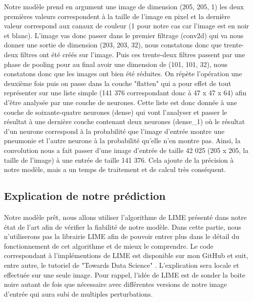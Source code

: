 Notre modèle prend en argument une image de dimension (205, 205, 1) les deux premières valeurs correspondent à la taille de l'image en pixel et la dernière valeur correspond aux canaux de couleur (1 pour notre cas car l'image est en noir et blanc). L'image vas donc passer dans le premier filtrage (conv2d) qui va nous donner une sortie de dimension (203, 203, 32), nous constatons donc que trente-deux filtres ont été créés sur l'image. Puis ces trente-deux filtres passent par une phase de pooling pour au final avoir une dimension de (101, 101, 32), nous constatons donc que les images ont bien été réduites. On répète l'opération une deuxième fois puis on passe dans la couche "flatten" qui a pour effet de tout représenter sur une liste simple (141 376 correspondant donc à 47 x 47 x 64) afin d'être analysée par une couche de neurones. Cette liste est donc donnée à une couche de soixante-quatre neurones (dense) qui vont l'analyser et passer le résultat à une dernière couche contenant deux neurones (dense\_1) où le résultat d'un neurone correspond à la probabilité que l'image d'entrée montre une pneumonie et l'autre neurone à la probabilité qu'elle n'en montre pas. Ainsi, la convolution nous a fait passer d'une image d'entrée de taille 42 025 (205 x 205, la taille de l'image) à une entrée de taille 141 376. Cela ajoute de la précision à notre modèle, mais a un temps de traitement et de calcul très conséquent. 

\subsection{Explication de notre prédiction}
\paragraph{}Notre modèle prêt, nous allons utiliser l'algorithme de LIME présenté dans notre état de l'art afin de vérifier la fiabilité de notre modèle. Dans cette partie, nous n'utiliserons pas la librairie LIME afin de pouvoir entrer plus dans le détail du fonctionnement de cet algorithme et de mieux le comprendre. Le code correspondant à l'implémentions de LIME est disponible sur mon GitHub \cite{limeMyDepot} et suit, entre autre, le tutoriel de "Towards Data Science" \cite{limeTuto}. L'explication sera locale et effectuée sur une seule image. Pour rappel,  l’idée de LIME est de sonder la boite noire autant de fois que nécessaire avec différentes versions de notre image d'entrée qui aura subi de multiples perturbations.

